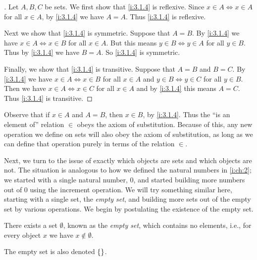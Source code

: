 \begin{proof}[]
  Let \(A, B, C\) be sets.
  We first show that \cref{i:3.1.4} is reflexive.
  Since \(x \in A \iff x \in A\) for all \(x \in A\), by \cref{i:3.1.4} we have \(A = A\).
  Thus \cref{i:3.1.4} is reflexive.

  Next we show that \cref{i:3.1.4} is symmetric.
  Suppose that \(A = B\).
  By \cref{i:3.1.4} we have \(x \in A \iff x \in B\) for all \(x \in A\).
  But this means \(y \in B \iff y \in A\) for all \(y \in B\).
  Thus by \cref{i:3.1.4} we have \(B = A\).
  So \cref{i:3.1.4} is symmetric.

  Finally, we show that \cref{i:3.1.4} is transitive.
  Suppose that \(A = B\) and \(B = C\).
  By \cref{i:3.1.4} we have \(x \in A \iff x \in B\) for all \(x \in A\) and \(y \in B \iff y \in C\) for all \(y \in B\).
  Then we have \(x \in A \iff x \in C\) for all \(x \in A\) and by \cref{i:3.1.4} this means \(A = C\).
  Thus \cref{i:3.1.4} is transitive.
\end{proof}

\begin{note}
  Observe that if \(x \in A\) and \(A = B\), then \(x \in B\), by \cref{i:3.1.4}.
  Thus the ``is an element of'' relation \(\in\) obeys the axiom of substitution.
  Because of this, any new operation we define on sets will also obey the axiom of substitution, as long as we can define that operation purely in terms of the relation \(\in\).
\end{note}

\begin{note}
  Next, we turn to the issue of exactly which objects are sets and which objects are not.
  The situation is analogous to how we defined the natural numbers in \cref{i:ch:2};
  we started with a single natural number, \(0\), and started building more numbers out of \(0\) using the increment operation.
  We will try something similar here, starting with a single set, the \emph{empty set},
  and building more sets out of the empty set by various operations.
  We begin by postulating the existence of the empty set.
\end{note}

\begin{ax}\label{i:3.2}
  There exists a set \(\emptyset\), known as the \emph{empty set}, which contains no elements, i.e., for every object \(x\) we have \(x \notin \emptyset\).
\end{ax}

\begin{note}
  The empty set is also denoted \(\left\lbrace\right\rbrace\).
\end{note}

